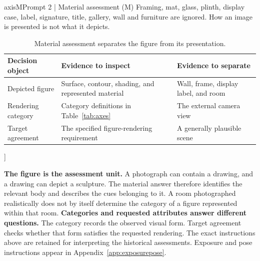 {\begin{minipage}{\textwidth}
\begin{promptcard}{axisM}{Prompt 2 | Material assessment (M)}
Framing, mat, glass, plinth, display case, label, signature, title, gallery,
wall and furniture are ignored. How an image is presented is not what it
depicts.
\end{promptcard}\begin{table}[H]
\centering\normalsize
\renewcommand{\arraystretch}{1.16}
\begin{tabularx}{\linewidth}{@{}lXX@{}}
\toprule
Decision object & Evidence to inspect & Evidence to separate \\
\midrule
Depicted figure & Surface, contour, shading, and represented material & Wall, frame, display label, and room \\
Rendering category & Category definitions in Table~\ref{tab:axes} & The external camera view \\
Target agreement & The specified figure-rendering requirement & A generally plausible scene \\
\bottomrule
\end{tabularx}
\caption{Material assessment separates the figure from its presentation.}\label{tab:appmaterialrules}
\end{table}
\end{minipage}}]

\textbf{The figure is the assessment unit.} A photograph can contain a drawing, and a drawing can depict a sculpture. The material answer therefore identifies the relevant body and describes the cues belonging to it. A room photographed realistically does not by itself determine the category of a figure represented within that room.
\newpage
\textbf{Categories and requested attributes answer different questions.} The category records the observed visual form. Target agreement checks whether that form satisfies the requested rendering. The exact instructions above are retained for interpreting the historical assessments. Exposure and pose instructions appear in Appendix~\ref{app:exposurepose}.

